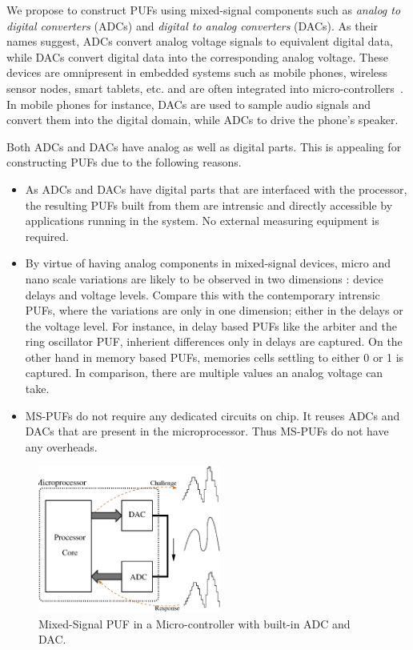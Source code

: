 We propose to construct PUFs using mixed-signal components such as {\em analog to
digital converters} (ADCs) and {\em digital to analog converters} (DACs).
As their names suggest, ADCs convert analog voltage signals 
to equivalent digital data, while DACs convert digital data into the corresponding
analog voltage. These devices are omnipresent in embedded 
systems such as mobile phones, wireless sensor nodes, smart tablets, etc.
and are often integrated into micro-controllers~\cite{xxx}. 
In mobile phones for instance, DACs are used to sample audio signals and convert
them into the digital domain, while ADCs to drive the phone's speaker. 

Both ADCs and DACs have analog as well as digital parts. This is
appealing for constructing PUFs due to the following reasons.
\begin{itemize}
\item As ADCs and DACs have digital parts that are interfaced with the
processor, the resulting PUFs built from them are intrensic and  
directly accessible by applications running in the system. No external 
measuring equipment is required.

\item By virtue of having analog components in mixed-signal devices, 
micro and nano scale variations are likely to be observed in two dimensions : 
device delays and voltage levels. Compare this with the contemporary intrensic
PUFs, where the variations are only in one dimension; either in the delays or
the voltage level. For instance, in delay based PUFs like the arbiter and the 
ring oscillator PUF, inherient differences
only in delays are captured. On the other hand in memory based PUFs, memories 
cells settling to either 0 or 1 is captured. In comparison, there are multiple 
values an analog voltage can take.

\item MS-PUFs do not require any dedicated circuits on chip. It reuses ADCs and
DACs that are present in the microprocessor. Thus MS-PUFs do not have any overheads.
\end{itemize}

\begin{figure}[!b]
\centering
\caption{Mixed-Signal PUF in a Micro-controller with built-in ADC and DAC. }
\includegraphics[width=6cm]{figs/mspuf}
\end{figure}


